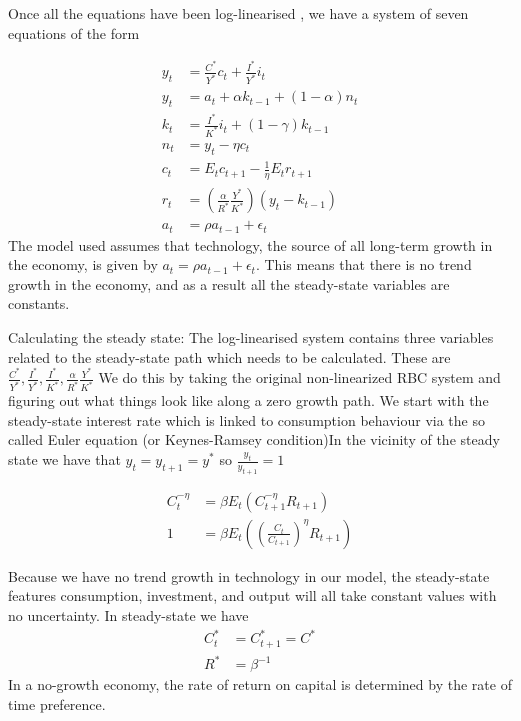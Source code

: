\documentclass{beamer}
\begin{document}
\begin{frame}
  Once all the equations have been log-linearised , we have a system of seven equations of the form

\begin{align}
  y_t &= \frac{C^*}{Y^*}c_t + \frac{I^*}{Y^*}i_t\\
  y_t &= a_t + \alpha k_{t-1} + (1-\alpha)n_t\\
  k_t &= \frac{I^*}{K^*}i_t + (1-\gamma)k_{t-1}\\
  n_t &= y_t-\eta c_t\\
  c_t &= E_tc_{t+1} - \frac{1}{\eta}E_t r_{t+1}\\
  r_t &= \left(\frac{\alpha}{R^*}\frac{Y^*}{K^*} \right)(y_t-k_{t-1})\\
  a_t &= \rho a_{t-1} + \epsilon_t
\end{align}
The model used assumes that technology, the source of all long-term growth in the economy, is given by $a_t=\rho a_{t-1} + \epsilon_t$. This means that there is no trend growth in the economy, and as a result all the steady-state variables are constants.
\end{frame}

\begin{frame}
 Calculating the steady state:
 The log-linearised system contains three variables related to the steady-state path which needs to be calculated.
 These are $\frac{C^*}{Y^*},\frac{I^*}{Y^*},\frac{I^*}{K^*},\frac{\alpha}{R^*}\frac{Y^*}{K^*}$
We do this by taking the original non-linearized RBC system and figuring out
what things look like along a zero growth path.
We start with the steady-state interest rate which is linked to consumption behaviour via the so called Euler equation (or Keynes-Ramsey condition)In the vicinity of the steady state we have that $y_t=y_{t+1}=y^*$ so $\frac{y_t}{y_{t+1}}=1$
\end{frame}

\begin{frame}
\begin{align}
  C_t^{-\eta} &= \beta E_t(C_{t+1}^{-\eta}R_{t+1})\\
  1 &= \beta E_t \left( \left(\frac{C_t}{C_{t+1}} \right)^\eta R_{t+1} \right)
\end{align}

Because we have no trend growth in technology in our model, the steady-state features consumption, investment, and output will all take constant values with no uncertainty.
In steady-state we have
\begin{align}
  C^*_t &= C^*_{t+1}=C^*\\
  R^* &= \beta^{-1}
\end{align}
In a no-growth economy, the rate of return on capital is determined by the
rate of time preference.

\end{frame}
\end{document}
